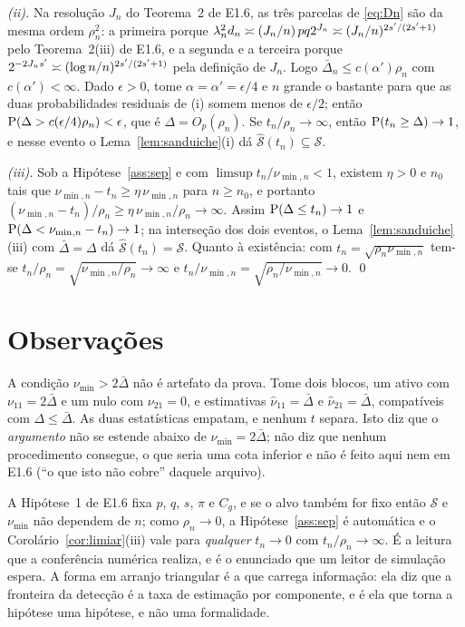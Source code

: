 \documentclass[11pt,a4paper]{article}
\newcommand{\Nhat}[2]{\widehat{\nu}_{#1#2}}
\newcommand{\Ntrue}[2]{\nu_{#1#2}}
\newcommand{\Shat}{\widehat{\mathcal{S}}}
\newcommand{\sepmin}{\nu_{\min}}
\newcommand{\sepminn}{\nu_{\min,n}}
\newcommand{\rn}{\rho}
\begin{document}
\emph{(ii).} Na resolução $J_{n}$ do Teorema~2 de E1.6, as três parcelas de
\eqref{eq:Dn} são da mesma ordem $\rn_{n}^{2}$: a primeira porque
$\lambda_{n}^{2}d_{n} \asymp (J_{n}/n)\,pq2^{J_{n}} \asymp (J_{n}/n)^{2s'/(2s'+1)}$
pelo Teorema~2(iii) de E1.6, e a segunda e a terceira porque
$2^{-2J_{n}s'} \asymp (\log n/n)^{2s'/(2s'+1)}$ pela definição de
$J_{n}$. Logo $\bar{\Delta}_{n} \le c(\alpha')\rn_{n}$ com $c(\alpha')<\infty$. Dado
$\epsilon>0$, tome $\alpha = \alpha' = \epsilon/4$ e $n$ grande o bastante
para que as duas probabilidades residuais de (i) somem menos de
$\epsilon/2$; então $\Prob(\Delta > c(\epsilon/4)\rn_{n}) < \epsilon$, que é
$\Delta = O_{p}(\rn_{n})$. Se $t_{n}/\rn_{n}\to\infty$, então
$\mathrm{P}(t_{n} \ge \Delta) \to 1$, e nesse evento o
Lema~\ref{lem:sanduiche}(i) dá $\Shat(t_{n})\subseteq \mathcal{S}$.

\emph{(iii).} Sob a Hipótese~\ref{ass:sep} e com
$\limsup t_{n}/\sepminn < 1$, existem $\eta>0$ e $n_{0}$ tais que
$\sepminn - t_{n} \ge \eta\,\sepminn$ para $n \ge n_{0}$, e portanto
$(\sepminn-t_{n})/\rn_{n} \ge \eta\,\sepminn/\rn_{n} \to\infty$.
Assim $\mathrm{P}(\Delta \le t_{n}) \to 1$ e
$\Prob(\Delta < \sepminn-t_{n}) \to 1$; na interseção dos dois eventos,
o Lema~\ref{lem:sanduiche}(iii) com $\bar{\Delta} = \Delta$ dá $\Shat(t_{n}) = \mathcal{S}$.
Quanto à existência: com $t_{n} = \sqrt{\rn_{n}\sepminn}$ tem-se
$t_{n}/\rn_{n} = \sqrt{\sepminn/\rn_{n}} \to\infty$ e
$t_{n}/\sepminn = \sqrt{\rn_{n}/\sepminn} \to 0$. \qed

\section{Observações}

\begin{remark}\label{rem:exata}
A condição $\sepmin > 2\bar{\Delta}$ não é artefato da prova. Tome dois blocos, um ativo
com $\Ntrue{1}{1} = 2\bar{\Delta}$ e um nulo com $\Ntrue{2}{1} = 0$, e estimativas
$\Nhat{1}{1} = \bar{\Delta}$ e $\Nhat{2}{1} = \bar{\Delta}$, compatíveis com $\Delta \le \bar{\Delta}$. As
duas estatísticas empatam, e nenhum $t$ separa. Isto diz que o \emph{argumento}
não se estende abaixo de $\sepmin = 2\bar{\Delta}$; não diz que nenhum procedimento
consegue, o que seria uma cota inferior e não é feito aqui nem em E1.6
(``o que isto não cobre'' daquele arquivo).
\end{remark}

\begin{remark}\label{rem:fixa}
A Hipótese~1 de E1.6 fixa $p$, $q$, $s$, $\pi$ e $C_{g}$, e se o alvo também
for fixo então $\mathcal{S}$ e $\sepmin$ não dependem de $n$; como $\rn_{n}\to 0$, a
Hipótese~\ref{ass:sep} é automática e o
Corolário~\ref{cor:limiar}(iii) vale para \emph{qualquer} $t_{n}\to 0$ com
$t_{n}/\rn_{n}\to\infty$. É a leitura que a conferência numérica realiza, e é
o enunciado que um leitor de simulação espera. A forma em arranjo triangular é
a que carrega informação: ela diz que a fronteira da detecção é a taxa de
estimação por componente, e é ela que torna a hipótese uma hipótese, e não uma
formalidade.
\end{remark}
\end{document}
